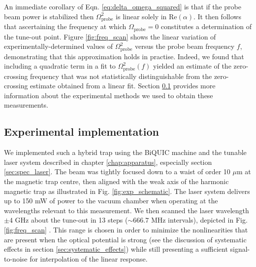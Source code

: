 	An immediate corollary of Eqn. \ref{eq:delta_omega_squared} is that if the probe beam power is stabilized then $\Omega_\mathrm{probe}^2$	is linear solely in $\mathrm{Re}(\alpha)$. 
	It then follows that ascertaining the frequency at which $\Omega_\mathrm{probe}=0$ constitutes a determination of the tune-out point.
	Figure \ref{fig:freq_scan} shows the linear variation of experimentally-determined values of $\Omega_\mathrm{probe}^2$ versus the probe beam frequency $f$, demonstrating that this approximation holds in practise. 
	Indeed, we found that including a quadratic term in a fit to $\Omega_\mathrm{probe}^2(f)$ yielded an estimate of the zero-crossing frequency that was not statistically distinguishable from the zero-crossing estimate obtained from a linear fit.
	Section \ref{sec:implementation} provides more information about the experimental methods we used to obtain these measurements.





\subsection{Experimental implementation}
	\label{sec:implementation}
	We implemented such a hybrid trap using the BiQUIC machine and the tunable laser system described in chapter \ref{chap:apparatus}, especially section \ref{sec:spec_laser}. 
	The beam was tightly focused down to a waist of order 10 $\mu$m at the magnetic trap centre, then aligned with the weak axis of the harmonic magnetic trap as illustrated in Fig. \ref{fig:exp_schematic}.
	The laser system delivers up to 150 mW of power to the vacuum chamber when operating at the wavelengths relevant to this measurement. 
	We then scanned the laser wavelength $\pm4$ GHz about the tune-out in 13 steps ($\sim666.7$ MHz intervals), depicted in Fig. \ref{fig:freq_scan} .	
	This range is chosen in order to minimize the nonlinearities that are present when the optical potential is strong (see the discussion of systematic effects in section \ref{sec:systematic_effects}) while still presenting a sufficient signal-to-noise for interpolation of the linear response.
	
